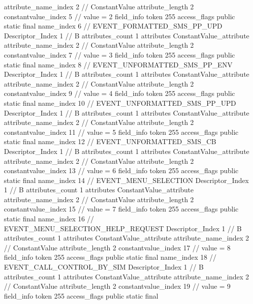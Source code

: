 {{{{{{{					attribute_name_index	2		// ConstantValue
					attribute_length	2
					constantvalue_index	5		// value = 2
				}
				}
			}
			field_info {
				token	255
				access_flags	public static final
				name_index	6		// EVENT_FORMATTED_SMS_PP_UPD
				Descriptor_Index	1		// B
				attributes_count	1
				attributes {
				ConstantValue_attribute {
					attribute_name_index	2		// ConstantValue
					attribute_length	2
					constantvalue_index	7		// value = 3
				}
				}
			}
			field_info {
				token	255
				access_flags	public static final
				name_index	8		// EVENT_UNFORMATTED_SMS_PP_ENV
				Descriptor_Index	1		// B
				attributes_count	1
				attributes {
				ConstantValue_attribute {
					attribute_name_index	2		// ConstantValue
					attribute_length	2
					constantvalue_index	9		// value = 4
				}
				}
			}
			field_info {
				token	255
				access_flags	public static final
				name_index	10		// EVENT_UNFORMATTED_SMS_PP_UPD
				Descriptor_Index	1		// B
				attributes_count	1
				attributes {
				ConstantValue_attribute {
					attribute_name_index	2		// ConstantValue
					attribute_length	2
					constantvalue_index	11		// value = 5
				}
				}
			}
			field_info {
				token	255
				access_flags	public static final
				name_index	12		// EVENT_UNFORMATTED_SMS_CB
				Descriptor_Index	1		// B
				attributes_count	1
				attributes {
				ConstantValue_attribute {
					attribute_name_index	2		// ConstantValue
					attribute_length	2
					constantvalue_index	13		// value = 6
				}
				}
			}
			field_info {
				token	255
				access_flags	public static final
				name_index	14		// EVENT_MENU_SELECTION
				Descriptor_Index	1		// B
				attributes_count	1
				attributes {
				ConstantValue_attribute {
					attribute_name_index	2		// ConstantValue
					attribute_length	2
					constantvalue_index	15		// value = 7
				}
				}
			}
			field_info {
				token	255
				access_flags	public static final
				name_index	16		// EVENT_MENU_SELECTION_HELP_REQUEST
				Descriptor_Index	1		// B
				attributes_count	1
				attributes {
				ConstantValue_attribute {
					attribute_name_index	2		// ConstantValue
					attribute_length	2
					constantvalue_index	17		// value = 8
				}
				}
			}
			field_info {
				token	255
				access_flags	public static final
				name_index	18		// EVENT_CALL_CONTROL_BY_SIM
				Descriptor_Index	1		// B
				attributes_count	1
				attributes {
				ConstantValue_attribute {
					attribute_name_index	2		// ConstantValue
					attribute_length	2
					constantvalue_index	19		// value = 9
				}
				}
			}
			field_info {
				token	255
				access_flags	public static final
}}}}}
